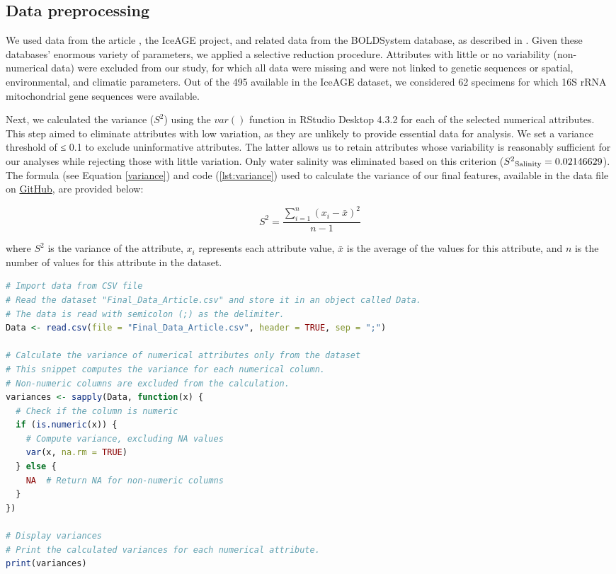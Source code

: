 \subsection{Data preprocessing}
We used data from the article \citep{uhlir_adding_2021}, the IceAGE project, and related data from the BOLDSystem database, as described in \citep{uhlir_adding_2021}. Given these databases' enormous variety of parameters, we applied a selective reduction procedure. Attributes with little or no variability (non-numerical data) were excluded from our study, for which all data were missing and were not linked to genetic sequences or spatial, environmental, and climatic parameters. Out of the 495 available in the IceAGE dataset, we considered 62 specimens for which 16S rRNA mitochondrial gene sequences were available. 

Next, we calculated the variance ($S^2$) using the $var()$ function in RStudio Desktop 4.3.2 for each of the selected numerical attributes. This step aimed to eliminate attributes with low variation, as they are unlikely to provide essential data for analysis. We set a variance threshold of ≤ 0.1 to exclude uninformative attributes. The latter allows us to retain attributes whose variability is reasonably sufficient for our analyses while rejecting those with little variation. Only water salinity was eliminated based on this criterion ($S^2\textsubscript{Salinity} = 0.02146629$). The formula (see Equation \ref{variance}) and code (\autoref{lst:variance}) used to calculate the variance of our final features, available in the data file on \href{https://github.com/tahiri-lab/Cumacea_aPhyloGeo}{GitHub}, are provided below:

\begin{equation}\label{variance}
    S^2 = \frac{\sum_{i=1}^{n} (x_i - \bar{x})^2}{n-1}
\end{equation}

where $S^2$ is the variance of the attribute, $x_i$ represents each attribute value, $\bar{x}$ is the average of the values for this attribute, and $n$ is the number of values for this attribute in the dataset.

\begin{lstlisting}[label=lst:variance,language=R,caption=RStudio script to calculate the variance of each numerical attributes in our final dataset]
# Import data from CSV file
# Read the dataset "Final_Data_Article.csv" and store it in an object called Data.
# The data is read with semicolon (;) as the delimiter.
Data <- read.csv(file = "Final_Data_Article.csv", header = TRUE, sep = ";")

# Calculate the variance of numerical attributes only from the dataset
# This snippet computes the variance for each numerical column.
# Non-numeric columns are excluded from the calculation.
variances <- sapply(Data, function(x) {
  # Check if the column is numeric
  if (is.numeric(x)) {
    # Compute variance, excluding NA values
    var(x, na.rm = TRUE)
  } else {
    NA  # Return NA for non-numeric columns
  }
})

# Display variances
# Print the calculated variances for each numerical attribute.
print(variances)
\end{lstlisting}

